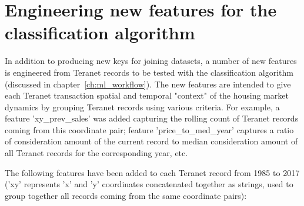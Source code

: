\section{Engineering new features for the classification algorithm} \label{sec:feature_engineering}

In addition to producing new keys for joining datasets, a number of new features is engineered from Teranet records to be tested with the classification algorithm (discussed in chapter~\ref{ch:ml_workflow}).
The new features are intended to give each Teranet transaction spatial and temporal "context" of the housing market dynamics by grouping Teranet records using various criteria.
For example, a feature 'xy\_prev\_sales' was added capturing the rolling count of Teranet records coming from this coordinate pair;
feature 'price\_to\_med\_year' captures a ratio of consideration amount of the current record to median consideration amount of all Teranet records for the corresponding year, etc.

The following features have been added to each Teranet record from 1985 to 2017 ('xy' represents 'x' and 'y' coordinates concatenated together as strings, used to group together all records coming from the same coordinate pairs):

